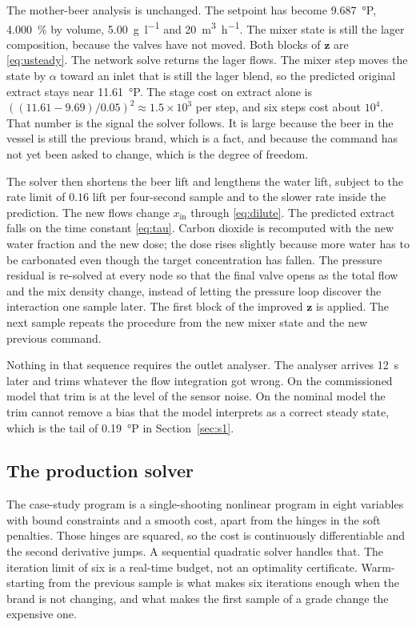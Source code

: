 The mother-beer analysis is unchanged. The setpoint has become \SI{9.687}{\degree}P, \SI{4.000}{\percent} by volume, \SI{5.00}{\gram\per\litre} and \SI{20}{\cubic\metre\per\hour}. The mixer state is still the lager composition, because the valves have not moved. Both blocks of $\mathbf{z}$ are \eqref{eq:usteady}. The network solve returns the lager flows. The mixer step moves the state by $\alpha$ toward an inlet that is still the lager blend, so the predicted original extract stays near \SI{11.61}{\degree}P. The stage cost on extract alone is $((11.61-9.69)/0.05)^{2} \approx 1.5\times 10^{3}$ per step, and six steps cost about $10^{4}$. That number is the signal the solver follows. It is large because the beer in the vessel is still the previous brand, which is a fact, and because the command has not yet been asked to change, which is the degree of freedom.

The solver then shortens the beer lift and lengthens the water lift, subject to the rate limit of $0.16$ lift per four-second sample and to the slower rate inside the prediction. The new flows change $x_{\mathrm{in}}$ through \eqref{eq:dilute}. The predicted extract falls on the time constant \eqref{eq:tau}. Carbon dioxide is recomputed with the new water fraction and the new dose; the dose rises slightly because more water has to be carbonated even though the target concentration has fallen. The pressure residual is re-solved at every node so that the final valve opens as the total flow and the mix density change, instead of letting the pressure loop discover the interaction one sample later. The first block of the improved $\mathbf{z}$ is applied. The next sample repeats the procedure from the new mixer state and the new previous command.

Nothing in that sequence requires the outlet analyser. The analyser arrives \SI{12}{\second} later and trims whatever the flow integration got wrong. On the commissioned model that trim is at the level of the sensor noise. On the nominal model the trim cannot remove a bias that the model interprets as a correct steady state, which is the tail of \SI{0.19}{\degree}P in Section~\ref{sec:s1}.

\subsection{The production solver}
\label{sec:rti}

The case-study program is a single-shooting nonlinear program in eight variables with bound constraints and a smooth cost, apart from the hinges in the soft penalties. Those hinges are squared, so the cost is continuously differentiable and the second derivative jumps. A sequential quadratic solver handles that. The iteration limit of six is a real-time budget, not an optimality certificate. Warm-starting from the previous sample is what makes six iterations enough when the brand is not changing, and what makes the first sample of a grade change the expensive one.

